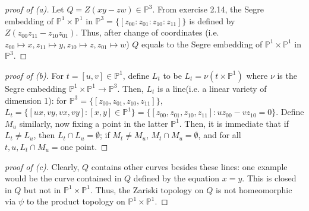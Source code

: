 \documentclass[12pt,letterpaper]{article}
\theoremstyle{definition}
\theoremstyle{remark}
\numberwithin{equation}{section}
\numberwithin{figure}{problem}
\newcommand{\PP}{\mathbb{P}}
\begin{document}
\begin{proof}[proof of (a)] Let $Q = Z(xy -zw) \in \PP^3$. From exercise 2.14, the Segre embedding of $\PP^1 \times \PP^1$ in $\PP^3= \{[z_{00}:z_{01}:z_{10}:z_{11}]\}$ is defined by $Z(z_{00}z_{11}-z_{10}z_{01})$. Thus, after change of coordinates (i.e. $z_{00} \mapsto x, z_{11} \mapsto y, z_{10} \mapsto z, z_{01} \mapsto w$) $Q$  equals to the Segre embedding of $\PP^1 \times \PP^1$ in $\PP^3$. 
\end{proof}

\begin{proof}[proof of (b)] For $t = [u,v] \in \PP^1$, define $L_t$ to be $L_t = \nu (t \times \PP^1)$ where $\nu$ is the Segre embedding $\PP^1 \times \PP^1 \to \PP^3$. Then, $L_t$ is a line(i.e. a linear variety of dimension 1): for $\PP^3 = \{[z_{00}, z_{01}, z_{10}, z_{11}]\}$, $L_t = \{[ux, vy, vx, vy]: [x,y] \in \PP^1 \}= \{[z_{00}, z_{01}, z_{10}, z_{11}]: uz_{00} - vz_{10} = 0\}$. Define $M_u$ similarly, now fixing a point in the latter $\PP^1$. Then, it is immediate that if $L_t \neq L_u$, then $L_t \cap L_u = \emptyset $; if $M_t \neq M_u$, $M_t \cap M_u = \emptyset$, and for all $t,u, L_t \cap M_u = \mbox{one point}$.

\end{proof}



\begin{proof}[proof of (c)] Clearly, $Q$ contains other curves besides these lines: one example would be the curve contained in $Q$ defined by the equation $x = y$. This is closed in $Q$ but not in $\PP^1 \times \PP^1$. Thus, the Zariski topology on $Q$ is not homeomorphic via $\psi$ to the product topology on $\PP^1 \times \PP^1$.

\end{proof}
\end{document}

